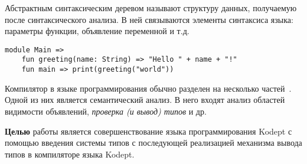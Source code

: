 
Абстрактным синтаксическим деревом называют структуру данных, получаемую после синтаксического анализа.
В ней связываются элементы синтаксиса языка: параметры функции, объявление переменной и т.д.

\begin{lstlisting}[label={lst:syntax},caption={Демонстрация синтаксиса языка Kodept}]
    module Main =>
    fun greeting(name: String) => "Hello " + name + "!"
    fun main => print(greeting("world"))
\end{lstlisting}

Компилятор в языке программирования обычно разделен на несколько частей~.
Одной из них является семантический анализ.
В него входят анализ областей видимости объявлений, \textit{проверка (и вывод) типов} и др.

\textbf{Целью} работы является совершенствование языка программирования Kodept с помощью введения системы типов с последующей реализацией механизма вывода типов в компиляторе языка Kodept.


